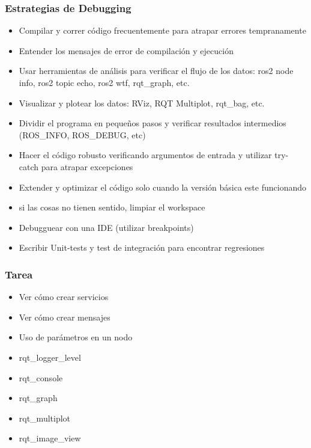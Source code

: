 \begin{frame}
    \frametitle{Estrategias de Debugging}
    
    \begin{itemize}
        \item Compilar y correr código frecuentemente para atrapar errores tempranamente
        \item Entender los mensajes de error de compilación y ejecución
        \item Usar herramientas de análisis para verificar el flujo de los datos: ros2 node info, ros2 topic echo, ros2 wtf, rqt\_graph, etc.
        \item Visualizar y plotear los datos: RViz, RQT Multiplot, rqt\_bag, etc.
        \item Dividir el programa en pequeños pasos y verificar resultados intermedios (ROS\_INFO, ROS\_DEBUG, etc)
        \item Hacer el código robusto verificando argumentos de entrada y utilizar try-catch para atrapar excepciones
        \item Extender y optimizar el código solo cuando la versión básica este funcionando
        \item si las cosas no tienen sentido, limpiar el workspace
        \item Debugguear con una IDE (utilizar breakpoints)
        \item Escribir Unit-tests y test de integración para encontrar regresiones
    \end{itemize}
    
\end{frame}

\begin{frame}
	\frametitle{Tarea}
	
	\begin{itemize}
		\item Ver cómo crear servicios
		\item Ver cómo crear mensajes
		\item Uso de parámetros en un nodo
		\item rqt\_logger\_level
		\item rqt\_console
		\item rqt\_graph
		\item rqt\_multiplot
		\item rqt\_image\_view
	\end{itemize}
	
\end{frame}


